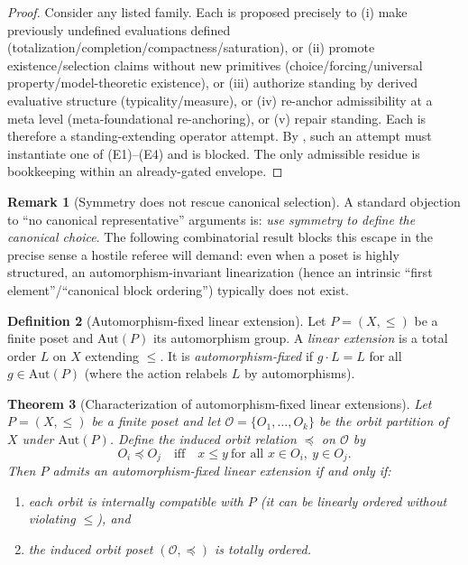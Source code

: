 \documentclass[11pt]{article}
\newtheorem{theorem}{Theorem}[section]
\theoremstyle{definition}
\newtheorem{definition}[theorem]{Definition}
\newtheorem{remark}[theorem]{Remark}
\begin{document}
\begin{proof}
Consider any listed family.
Each is proposed precisely to (i) make previously undefined evaluations defined (totalization/completion/compactness/saturation), or (ii) promote existence/selection claims without new primitives (choice/forcing/universal property/model-theoretic existence), or (iii) authorize standing by derived evaluative structure (typicality/measure), or (iv) re-anchor admissibility at a meta level (meta-foundational re-anchoring), or (v) repair standing.
Each is therefore a standing-extending operator attempt.
By , such an attempt must instantiate one of (E1)--(E4) and is blocked.
The only admissible residue is bookkeeping within an already-gated envelope.
\end{proof}

\begin{remark}[Symmetry does not rescue canonical selection]
\label{rem:poset-symmetry}
A standard objection to ``no canonical representative'' arguments is: \emph{use symmetry to define the canonical choice}.
The following combinatorial result blocks this escape in the precise sense a hostile referee will demand: even when a poset is highly structured, an automorphism-invariant linearization (hence an intrinsic ``first element''/``canonical block ordering'') typically does not exist.
\end{remark}

\begin{definition}[Automorphism-fixed linear extension]
Let $P=(X,\le)$ be a finite poset and $\mathrm{Aut}(P)$ its automorphism group.
A \emph{linear extension} is a total order $L$ on $X$ extending $\le$.
It is \emph{automorphism-fixed} if $g\cdot L=L$ for all $g\in \mathrm{Aut}(P)$ (where the action relabels $L$ by automorphisms).
\end{definition}

\begin{theorem}[Characterization of automorphism-fixed linear extensions]
\label{thm:aut-fixed}
Let $P=(X,\le)$ be a finite poset and let $\mathcal{O}=\{O_1,\dots,O_k\}$ be the orbit partition of $X$ under $\mathrm{Aut}(P)$.
Define the induced orbit relation $\preceq$ on $\mathcal{O}$ by
\[
O_i\preceq O_j \quad\text{iff}\quad x\le y\ \text{for all }x\in O_i,\ y\in O_j.
\]
Then $P$ admits an automorphism-fixed linear extension if and only if:
\begin{enumerate}[label=(\roman*), leftmargin=2.0em]
\item each orbit is internally compatible with $P$ (it can be linearly ordered without violating $\le$), and
\item the induced orbit poset $(\mathcal{O},\preceq)$ is totally ordered.
\end{enumerate}
\end{theorem}
\end{document}
